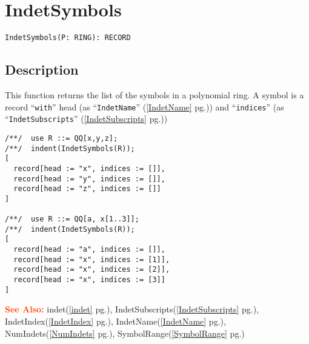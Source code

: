 \documentclass[a4paper]{mybook}
\newenvironment{command}{}{} %
\newcommand\SeeAlso{\par\textcolor{OrangeRed}{\textbf{\large See Also: }}}
\begin{document}
\section{IndetSymbols}
\label{IndetSymbols}
\begin{command} %


\begin{Verbatim}[label=syntax, rulecolor=\color{MidnightBlue},
frame=single]
IndetSymbols(P: RING): RECORD
\end{Verbatim}


\subsection*{Description}

This function returns the list of the symbols in a polynomial ring.
A symbol is a record ``\verb&with&'' head (as ``\verb&IndetName&'' (\ref{IndetName} pg.\pageref{IndetName}))
and ``\verb&indices&'' (as ``\verb&IndetSubscripts&'' (\ref{IndetSubscripts} pg.\pageref{IndetSubscripts}))
\begin{Verbatim}[label=example, rulecolor=\color{PineGreen}, frame=single]
/**/  use R ::= QQ[x,y,z];
/**/  indent(IndetSymbols(R));
[
  record[head := "x", indices := []],
  record[head := "y", indices := []],
  record[head := "z", indices := []]
]

/**/  use R ::= QQ[a, x[1..3]];
/**/  indent(IndetSymbols(R));
[
  record[head := "a", indices := []],
  record[head := "x", indices := [1]],
  record[head := "x", indices := [2]],
  record[head := "x", indices := [3]]
]
\end{Verbatim}


\SeeAlso %
  indet(\ref{indet} pg.\pageref{indet}), 
    IndetSubscripts(\ref{IndetSubscripts} pg.\pageref{IndetSubscripts}), 
    IndetIndex(\ref{IndetIndex} pg.\pageref{IndetIndex}), 
    IndetName(\ref{IndetName} pg.\pageref{IndetName}), 
    NumIndets(\ref{NumIndets} pg.\pageref{NumIndets}), 
    SymbolRange(\ref{SymbolRange} pg.\pageref{SymbolRange})
\end{command} %
\end{document}
